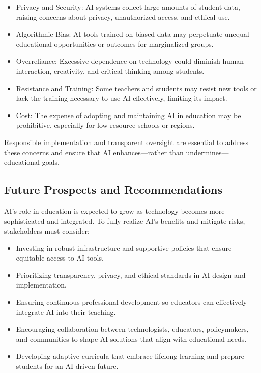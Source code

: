 \documentclass[12pt, letterpaper]{article}
\begin{document}
\begin{itemize}
    \item Privacy and Security: AI systems collect large amounts of student data, raising concerns about privacy, unauthorized access, and ethical use.

    \item Algorithmic Bias: AI tools trained on biased data may perpetuate unequal educational opportunities or outcomes for marginalized groups.

    \item Overreliance: Excessive dependence on technology could diminish human interaction, creativity, and critical thinking among students.

    \item Resistance and Training: Some teachers and students may resist new tools or lack the training necessary to use AI effectively, limiting its impact.
    \item Cost: The expense of adopting and maintaining AI in education may be prohibitive, especially for low-resource schools or regions.
\end{itemize}

Responsible implementation and transparent oversight are essential to address these concerns and ensure that AI enhances—rather than undermines—educational goals.
\subsection{Future Prospects and Recommendations}
AI’s role in education is expected to grow as technology becomes more sophisticated and integrated. To fully realize AI’s benefits and mitigate risks, stakeholders must consider:

\begin{itemize}
    \item Investing in robust infrastructure and supportive policies that ensure equitable access to AI tools.

    \item Prioritizing transparency, privacy, and ethical standards in AI design and implementation.

    \item Ensuring continuous professional development so educators can effectively integrate AI into their teaching.

    \item Encouraging collaboration between technologists, educators, policymakers, and communities to shape AI solutions that align with educational needs.

    \item Developing adaptive curricula that embrace lifelong learning and prepare students for an AI-driven future.
\end{itemize}
\end{document}
